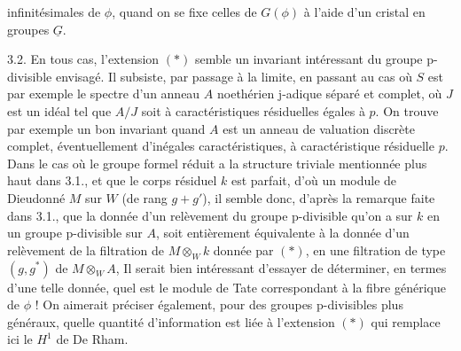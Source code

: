 infinitésimales de $\phi$, quand on se fixe celles de $G(\phi)$ à l'aide d'un cristal en groupes $\underline{G}$.

3.2. En tous cas, l'extension $(*)$ semble un invariant intéressant du groupe p-divisible envisagé. Il subsiste, par passage à la limite, en passant  au cas où $S$ est  par exemple le spectre d'un anneau $A$ noethérien j-adique séparé et complet, où $J$ est un idéal tel que $A/J$ soit à caractéristiques résiduelles égales à $p$. On trouve par exemple un bon invariant quand $A$ est un anneau de valuation discrète complet, éventuellement d'inégales caractéristiques, à caractéristique résiduelle $p$. Dans le cas où le groupe formel\deleted{,} réduit a la structure triviale  mentionnée plus haut dans 3.1., et que le corps résiduel $k$ est parfait, d'où un module de Dieudonné $M$ sur $W$ (de rang $g+g'$), il semble donc, d'après la remarque faite dans 3.1., que la donnée d'un relèvement du groupe p-divisible qu'on a sur $k$ en un groupe p-divisible sur $A$, soit entièrement équivalente à la donnée d'un relèvement de la filtration de $M\otimes_Wk$ donnée par $(*)$, en une filtration de type $(g,g^*)$ de $M\otimes_WA$,  Il serait bien intéressant d'essayer de déterminer, en termes d'une telle donnée, quel est le module de Tate correspondant à la fibre générique de $\phi$ ! On aimerait préciser également, pour des groupes p-divisibles plus généraux, quelle quantité d'information est liée à l'extension $(*)$\inserted{,} qui remplace ici le $H^1$ de De Rham.
